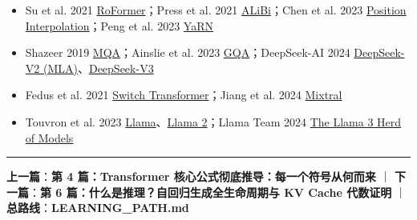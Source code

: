 \begin{itemize}
  \item Su et al. 2021 \href{https://arxiv.org/abs/2104.09864}{RoFormer}；Press et al. 2021 \href{https://arxiv.org/abs/2108.12409}{ALiBi}；Chen et al. 2023 \href{https://arxiv.org/abs/2306.15595}{Position Interpolation}；Peng et al. 2023 \href{https://arxiv.org/abs/2309.00071}{YaRN}
  \item Shazeer 2019 \href{https://arxiv.org/abs/1911.02150}{MQA}；Ainslie et al. 2023 \href{https://arxiv.org/abs/2305.13245}{GQA}；DeepSeek-AI 2024 \href{https://arxiv.org/abs/2405.04434}{DeepSeek-V2 (MLA)}、\href{https://arxiv.org/abs/2412.19437}{DeepSeek-V3}
  \item Fedus et al. 2021 \href{https://arxiv.org/abs/2101.03961}{Switch Transformer}；Jiang et al. 2024 \href{https://arxiv.org/abs/2401.04088}{Mixtral}
  \item Touvron et al. 2023 \href{https://arxiv.org/abs/2302.13971}{Llama}、\href{https://arxiv.org/abs/2307.09288}{Llama 2}；Llama Team 2024 \href{https://arxiv.org/abs/2407.21783}{The Llama 3 Herd of Models}
\end{itemize}

\vspace{0.8em}\hrule\vspace{0.8em}

\textbf{上一篇}：\textbf{第 4 篇：Transformer 核心公式彻底推导：每一个符号从何而来} ｜ \textbf{下一篇}：\textbf{第 6 篇：什么是推理？自回归生成全生命周期与 KV Cache 代数证明} ｜ \textbf{总路线}：\textbf{LEARNING\_PATH.md}
